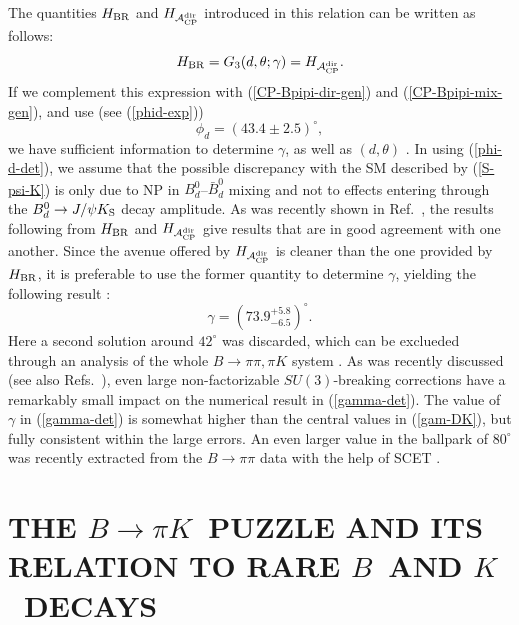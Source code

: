 \documentclass[11pt]{cernrep}
\begin{document}
The quantities $H_{\rm BR}$ and $H_{{\cal A}_{\rm CP}^{\rm dir}}$ introduced
in this relation can be written as follows:
\begin{equation}\label{H-fct}
H_{\rm BR} = G_3(d,\theta;\gamma) =
H_{{\cal A}_{\rm CP}^{\rm dir}}.
\end{equation}
If we complement this expression with (\ref{CP-Bpipi-dir-gen}) and
(\ref{CP-Bpipi-mix-gen}), and use (see (\ref{phid-exp}))
\begin{equation}\label{phi-d-det}
\phi_d=(43.4\pm2.5)^\circ,
\end{equation}
we have sufficient information to determine $\gamma$, 
as well as $(d,\theta)$  \cite{RF-BsKK,RF-Bpipi,FleischerMatias}. In using
(\ref{phi-d-det}), we assume that the possible discrepancy with the SM
described by (\ref{S-psi-K}) is only due to NP in $B^0_d$--$\bar B^0_d$ mixing
and not to effects entering through the $B^0_d\to J/\psi K_{\rm S}$ decay amplitude.
As was recently shown in Ref.~\cite{BFRS-5}, the results following from $H_{\rm BR}$ 
and $H_{{\cal A}_{\rm CP}^{\rm dir}}$ give results that are in good agreement with 
one another. Since the avenue offered by $H_{{\cal A}_{\rm CP}^{\rm dir}}$
is cleaner than the one provided by $H_{\rm BR}$, it is preferable to use the former
quantity to determine $\gamma$, yielding the following result \cite{BFRS-5}:
\begin{equation}\label{gamma-det}
\gamma=(73.9^{+5.8}_{-6.5})^\circ.
\end{equation}
Here a second solution around $42^\circ$ was discarded, which can be exclueded 
through an analysis of the whole $B\to\pi\pi,\pi K$ system \cite{BFRS3}. As was recently 
discussed  \cite{BFRS-5} (see also Refs.~\cite{RF-Bpipi,FleischerMatias}), even large 
non-factorizable $SU(3)$-breaking corrections have a remarkably small impact 
on the numerical result in (\ref{gamma-det}). The value of $\gamma$ in 
(\ref{gamma-det}) is somewhat higher than the central values in (\ref{gam-DK}),
but fully consistent within the large errors.  An even larger value in the ballpark of 
$80^\circ$ was recently extracted from the $B\to\pi\pi$ data with the help of SCET 
\cite{gam-SCET,SCET-Bdpi0K0}. 


%
%
%
\section{THE \boldmath$B\to\pi K$\unboldmath~PUZZLE AND ITS RELATION 
TO RARE \boldmath$B$\unboldmath~AND
\boldmath$K$\unboldmath~DECAYS}\label{sec:BpiK-puzzle}
\setcounter{equation}{0}
%
%
%
\end{document}
